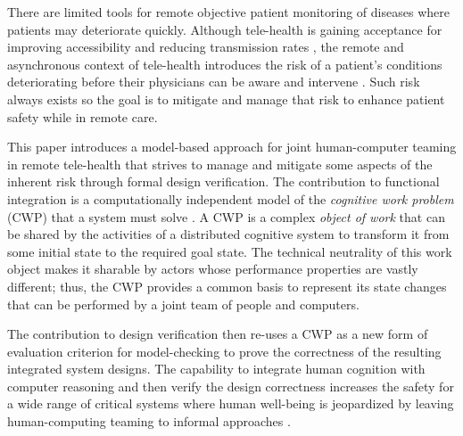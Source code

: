 There are limited tools for remote objective patient monitoring of diseases where patients may deteriorate quickly. Although tele-health is gaining acceptance for improving accessibility and reducing transmission rates \cite{10.1093/jamia/ocaa048,telehealth,10.1093/jamia/ocaa067}, the remote and asynchronous context of tele-health introduces the risk of a patient's conditions deteriorating before their physicians can be aware and intervene \cite{10.1097/ALN.0000000000003578}. Such risk always exists so the goal is to mitigate and manage that risk to enhance patient safety while in remote care. 

\begin{comment}
  Remote patient monitoring relies on clinicians, health IT, patients-caregivers, and other concurrent actors to each reliably perform various asynchronous tasks to coordinate patient care and safety \cite{remote,Aalam229}. Designing such systems becomes complex quickly because actors are outside the direct control of the system. These distributed and asynchronous characteristics make manual reasoning about functional integration and safety early in the design process very difficult; and yet, early in the design process is exactly the time to clearly establish the utility of the design in fulfilling its intended purpose. 
\end{comment}

This paper introduces a model-based approach for joint human-computer teaming in remote tele-health 
that strives to manage and mitigate some aspects of the inherent risk through formal design verification. The contribution to functional integration is a computationally independent model of the \emph{cognitive work problem} (CWP) that a system must solve \cite{workflowmodel,workcentered,BERRY201615,chi2010}.  A CWP is a complex \emph{object of work} that can be shared by the activities of a distributed cognitive system to transform it from some initial state to the required goal state. The technical neutrality of this work object makes it sharable by actors whose performance properties are vastly different; thus, the CWP provides a common basis to represent its state changes that can be performed by a joint team of people and computers. 

The contribution to design verification then re-uses a CWP as a new form of evaluation criterion for model-checking to prove the correctness of the resulting integrated system designs. The capability to integrate human cognition with computer reasoning and then verify the design correctness increases the safety for a wide range of critical systems where human well-being is jeopardized by leaving human-computing teaming to informal approaches \cite{remote,Aalam229}.

